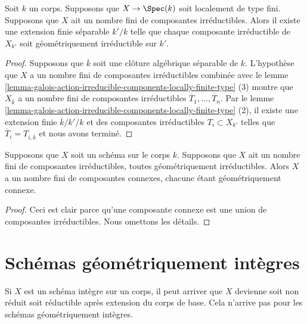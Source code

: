 \begin{lemma}
\label{lemma-finite-extension-geometrically-irreducible-components}
Soit $k$ un corps. Supposons que $X
\to \Spec(k)$ soit localement de type fini.
Supposons que $X$ ait un nombre fini de composantes
irréductibles. Alors il existe une extension finie
séparable $k'/k$ telle que chaque composante irréductible
de $X_{k'}$ soit géométriquement irréductible sur $k'$.
\end{lemma}

\begin{proof}
Supposons que $\overline{k}$ soit une clôture algébrique
séparable de $k$. L'hypothèse que $X$ a un nombre fini de
composantes irréductibles combinée avec le lemme
\ref{lemma-galois-action-irreducible-components-locally-finite-type}
(3) montre que $X_{\overline{k}}$ a un nombre fini de
composantes irréductibles $\overline{T}_1, \ldots,
\overline{T}_n$. Par le lemme
\ref{lemma-galois-action-irreducible-components-locally-finite-type} (2), il existe
une extension finie $\overline{k}/k'/k$ et des composantes irréductibles $T_i
\subset X_{k'}$ telles que $\overline{T}_i = T_{i, \overline{k}}$ et nous avons terminé.
\end{proof}

\begin{lemma}
\label{lemma-irreducible-components-geometrically-irreducible}
Supposons que $X$ soit un schéma sur le corps
$k$. Supposons que $X$ ait un nombre fini de
composantes irréductibles, toutes géométriquement
irréductibles. Alors $X$ a un nombre fini de
composantes connexes, chacune étant géométriquement connexe.
\end{lemma}

\begin{proof}
Ceci est clair parce qu'une composante connexe est
une union de composantes irréductibles. Nous omettons les détails.
\end{proof}







\section{Schémas géométriquement intègres}
\label{section-geometrically-integral}

\noindent
Si $X$ est un schéma intègre sur un corps, il peut arriver que $X$
devienne soit non réduit soit réductible après extension du corps de
base. Cela n'arrive pas pour les schémas géométriquement intègres.

